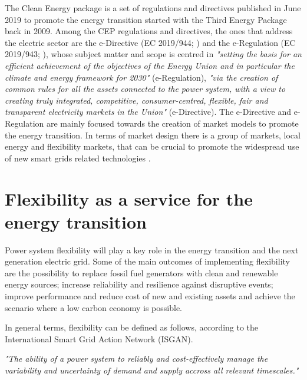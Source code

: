 The Clean Energy package is a set of regulations and directives published in June 2019 to promote the energy transition started with the Third Energy Package back in 2009. Among the CEP regulations and directives, the ones that address the electric sector are the e-Directive (EC 2019/944; \cite{Directive2019944}) and the e-Regulation (EC 2019/943; \cite{Directive2019943}), whose subject matter and scope is centred in \textit{"setting the basis for an efficient achievement of the objectives of the Energy Union and in particular the climate and energy framework for 2030"} (e-Regulation), \textit{"via the creation of common rules for all the assets connected to the power system, with a view to creating truly integrated, competitive, consumer-centred, flexible, fair and transparent electricity markets in the Union"} (e-Directive). The e-Directive and e-Regulation are mainly focused towards the creation of market models to
promote the energy transition. In terms of market design there is a group of markets, local energy and flexibility markets, that can be crucial to promote the widespread use of new smart grids related technologies \cite{Xu2019}.


\section{Flexibility as a service for the energy transition}
Power system flexibility will play a key role in the energy transition and the next generation electric grid. Some of the main outcomes of implementing flexibility are the possibility to replace fossil fuel generators with clean and renewable energy sources; increase reliability and resilience against disruptive events; improve performance and reduce cost of new and existing assets and achieve the scenario where a low carbon economy is possible. 

In general terms, flexibility can be defined as follows, according to the International Smart Grid Action Network (ISGAN)\cite{Hillberg2019}.
\vspace*{3mm}
\begin{tcolorbox}
\textit{"The ability of a power system to reliably and cost-effectively manage the variability and uncertainty of demand and supply accross all relevant timescales."}
\end{tcolorbox} 
\vspace*{3mm}


